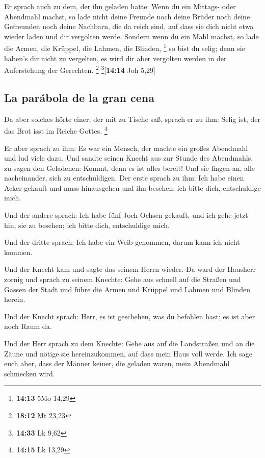  Er sprach auch zu dem, der ihn geladen hatte: Wenn du
ein Mittags- oder Abendmahl machst, so lade nicht deine Freunde noch
deine Brüder noch deine Gefreunden noch deine Nachbarn, die da reich
sind, auf dass sie dich nicht etwa wieder laden und dir vergolten werde.
 Sondern wenn du ein Mahl machst, so lade die Armen, die
Krüppel, die Lahmen, die Blinden, \footnote{\textbf{14:13} 5Mo 14,29}
 so bist du selig; denn sie haben's dir nicht zu
vergelten, es wird dir aber vergolten werden in der Auferstehung der
Gerechten. \footnote{\textbf{18:12} Mt 23,23}
\footnote{\textbf{14:33} Lk 9,62}{[}\textbf{14:14} Joh 5,29{]}

\hypertarget{la-paruxe1bola-de-la-gran-cena}{%
\subsection{La parábola de la gran
cena}\label{la-paruxe1bola-de-la-gran-cena}}

 Da aber solches hörte einer, der mit zu Tische saß,
sprach er zu ihm: Selig ist, der das Brot isst im Reiche Gottes.
\footnote{\textbf{14:15} Lk 13,29}

 Er aber sprach zu ihm: Es war ein Mensch, der machte ein
großes Abendmahl und lud viele dazu.  Und sandte seinen
Knecht aus zur Stunde des Abendmahls, zu sagen den Geladenen: Kommt,
denn es ist alles bereit!  Und sie fingen an, alle
nacheinander, sich zu entschuldigen. Der erste sprach zu ihm: Ich habe
einen Acker gekauft und muss hinausgehen und ihn besehen; ich bitte
dich, entschuldige mich.

 Und der andere sprach: Ich habe fünf Joch Ochsen
gekauft, und ich gehe jetzt hin, sie zu besehen; ich bitte dich,
entschuldige mich.

 Und der dritte sprach: Ich habe ein Weib genommen, darum
kann ich nicht kommen.

 Und der Knecht kam und sagte das seinem Herrn wieder. Da
ward der Hausherr zornig und sprach zu seinem Knechte: Gehe aus schnell
auf die Straßen und Gassen der Stadt und führe die Armen und Krüppel und
Lahmen und Blinden herein.

 Und der Knecht sprach: Herr, es ist geschehen, was du
befohlen hast; es ist aber noch Raum da.

 Und der Herr sprach zu dem Knechte: Gehe aus auf die
Landstraßen und an die Zäune und nötige sie hereinzukommen, auf dass
mein Haus voll werde.  Ich sage euch aber, dass der
Männer keiner, die geladen waren, mein Abendmahl schmecken wird.

